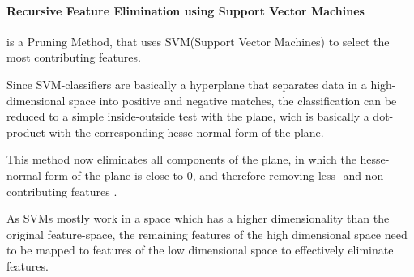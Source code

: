 \paragraph{Recursive Feature Elimination using Support Vector Machines}
\label{par:methods.flat.embedded.svm}


is a Pruning Method, that uses SVM(Support Vector Machines) to select the most
contributing features.

Since SVM-classifiers are basically a hyperplane that separates data in a
high-dimensional space into positive and negative matches, the classification
can be reduced to a simple inside-outside test with the plane, wich is basically
a dot-product with the corresponding hesse-normal-form of the plane.

This method now eliminates all components of the plane, in which the
hesse-normal-form of the plane is close to $0$, and therefore removing
less- and non-contributing features \cite{Brank:02}.

As SVMs mostly work in a space which has a higher dimensionality than the
original feature-space, the remaining features of the high dimensional space
need to be mapped to features of the low dimensional space to effectively
eliminate features.